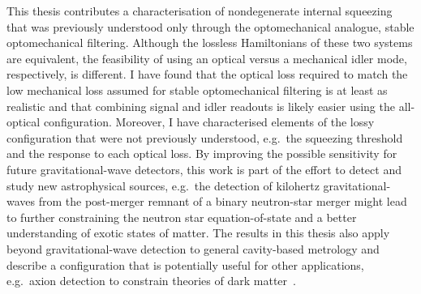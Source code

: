 This thesis contributes a characterisation of nondegenerate internal squeezing that was previously understood only through the optomechanical analogue, stable optomechanical filtering. Although the lossless Hamiltonians of these two systems are equivalent, the feasibility of using an optical versus a mechanical idler mode, respectively, is different. I have found that the optical loss required to match the low mechanical loss assumed for stable optomechanical filtering is at least as realistic and that combining signal and idler readouts is likely easier using the all-optical configuration. Moreover, I have characterised elements of the lossy configuration that were not previously understood, e.g.\ the squeezing threshold and the response to each optical loss.
By improving the possible sensitivity for future gravitational-wave detectors, this work is part of the effort to detect and study new astrophysical sources, e.g.\ the detection of kilohertz gravitational-waves from the post-merger remnant of a binary neutron-star merger might lead to further constraining the neutron star equation-of-state and a better understanding of exotic states of matter.
The results in this thesis also apply beyond gravitational-wave detection to general cavity-based metrology and describe a configuration that is potentially useful for other applications, e.g.\ axion detection to constrain theories of dark matter~\cite{}.



